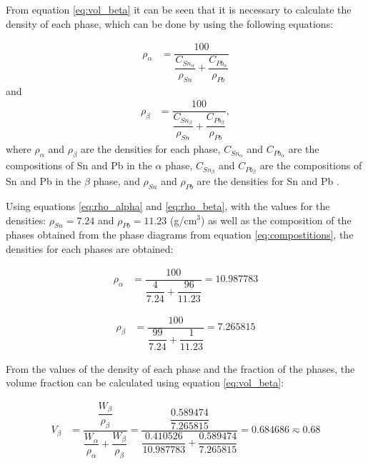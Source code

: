 From equation \eqref{eq:vol_beta} it can be seen that it is necessary to calculate the density of each phase, which can be done by using the following equations:

\begin{align}
    \label{eq:rho_alpha}
    \rho_{\alpha}&=\dfrac{100}{\dfrac{C_{Sn_{\alpha}}}{\rho_{Sn}}+\dfrac{C_{Pb_{\alpha}}}{\rho_{Pb}}}
\end{align}
and
\begin{align}
    \label{eq:rho_beta}
    \rho_{\beta}&=\dfrac{100}{\dfrac{C_{Sn_{\beta}}}{\rho_{Sn}}+\dfrac{C_{Pb_{\beta}}}{\rho_{Pb}}},
\end{align}
where $\rho_{\alpha}$ and $\rho_{\beta}$ are the densities for each phase, $C_{Sn_{\alpha}}$ and $C_{Pb_{\alpha}}$ are the compositions of Sn and Pb in the $\alpha$ phase, $C_{Sn_{\beta}}$ and $C_{Pb_{\beta}}$ are the compositions of Sn and Pb in the $\beta$ phase, and $\rho_{Sn}$ and $\rho_{Pb}$ are the densities for Sn and Pb \citep[p.~97]{callister2010materials}.

Using equations \eqref{eq:rho_alpha} and \eqref{eq:rho_beta}, with the values for the densities: $\rho_{Sn}=7.24$ and $\rho_{Pb}=11.23$ (g/cm$^3$) \citep{callister2010materials} as well as the composition of the phases obtained from the phase diagrams from equation \ref{eq:compostitions}, the densities for each phases are obtained:

\begin{align}
    \label{eq:rho_alpha_num}
    \rho_{\alpha}&=\dfrac{100}{\dfrac{4}{7.24}+\dfrac{96}{11.23}}=10.987783
\end{align}

\begin{align}
    \label{eq:rho_beta_num}
    \rho_{\beta}&=\dfrac{100}{\dfrac{99}{7.24}+\dfrac{1}{11.23}}=7.265815
\end{align}

From the values of the density of each phase and the fraction of the phases, the volume fraction can be calculated using equation \eqref{eq:vol_beta}:

\begin{align}
    \label{eq:vol_beta_num}
    V_{\beta}&=\dfrac{\dfrac{W_{\beta}}{\rho_{\beta}}}{\dfrac{W_{\alpha}}{\rho_{\alpha}}+\dfrac{W_{\beta}}{\rho_{\beta}}}=\dfrac{\dfrac{0.589474}{7.265815}}{\dfrac{0.410526}{10.987783}+\dfrac{0.589474}{7.265815}}=0.684686\eqsim 0.68
\end{align}


